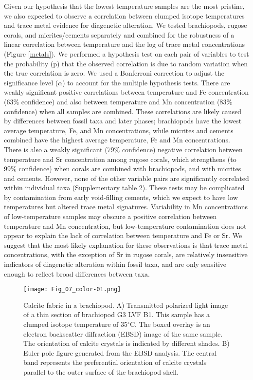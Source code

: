 \documentclass[5p, authoryear]{elsarticle}
\begin{document}
Given our hypothesis that the lowest temperature samples are the most pristine, we also expected to observe a correlation between clumped isotope temperatures and trace metal evidence for diagenetic alteration. We tested brachiopods, rugose corals, and micrites/cements separately and combined for the robustness of a linear correlation between temperature and the log of trace metal concentrations (Figure \ref{metals}). We performed a hypothesis test on each pair of variables to test the probability (p) that the observed correlation is due to random variation when the true correlation is zero. We used a Bonferroni correction to adjust the significance level ($\alpha$) to account for the multiple hypothesis tests. There are weakly significant positive correlations between temperature and Fe concentration (63\% confidence) and also between temperature and Mn concentration (83\% confidence) when all samples are combined. These correlations are likely caused by differences between fossil taxa and later phases; brachiopods have the lowest average temperature, Fe, and Mn concentrations, while micrites and cements combined have the highest average temperature, Fe and Mn concentrations. There is also a weakly significant (79\% confidence) negative correlation between temperature and Sr concentration among rugose corals, which strengthens (to 99\% confidence) when corals are combined with brachiopods, and with micrites and cements. However, none of the other variable pairs are significantly correlated within individual taxa (Supplementary table 2). These tests may be complicated by contamination from early void-filling cements, which we expect to have low temperatures but altered trace metal signatures. Variability in Mn concentrations of low-temperature samples may obscure a positive correlation between temperature and Mn concentration, but low-temperature contamination does not appear to explain the lack of correlation between temperature and Fe or Sr. We suggest that the most likely explanation for these observations is that trace metal concentrations, with the exception of Sr in rugose corals, are relatively insensitive indicators of diagenetic alteration within fossil taxa, and are only sensitive enough to reflect broad differences between taxa. 

\begin{figure*}[tb]
\centering
\texttt{[image: Fig\_07\_color-01.png]}
\caption{Calcite fabric in a brachiopod. A) Transmitted polarized light image of a thin section of brachiopod G3 LVF B1. This sample has a clumped isotope temperature of 35$^{\circ}$C. The boxed overlay is an electron backscatter diffraction (EBSD) image of the same sample. The orientation of calcite crystals is indicated by different shades. B) Euler pole figure generated from the EBSD analysis. The central band represents the preferential orientation of calcite crystals parallel to the outer surface of the brachiopod shell.}
\label{EBSD_brach}
\end{figure*}
\end{document}
